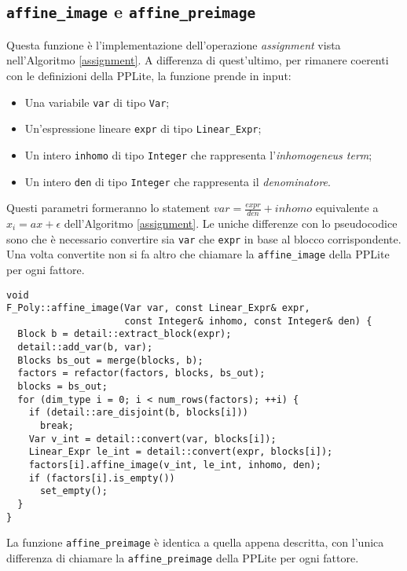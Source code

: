 \documentclass{mimosis}
\theoremstyle{definition}
\begin{document}
\subsection{\texttt{affine\_image} e \texttt{affine\_preimage}}
\label{sec:org766216e}
Questa funzione è l'implementazione dell'operazione \emph{assignment} vista
nell'Algoritmo \ref{assignment}. A differenza di quest'ultimo, per rimanere
coerenti con le definizioni della PPLite, la funzione prende in input:

\begin{itemize}
\item Una variabile \texttt{var} di tipo \texttt{Var};
\item Un'espressione lineare \texttt{expr} di tipo \texttt{Linear\_Expr};
\item Un intero \texttt{inhomo} di tipo \texttt{Integer} che rappresenta l'\emph{inhomogeneus term};
\item Un intero \texttt{den} di tipo \texttt{Integer} che rappresenta il \emph{denominatore}.
\end{itemize}

Questi parametri formeranno lo statement \(var = \frac{expr}{den} + inhomo\)
equivalente a \(x_i = ax + \epsilon\) dell'Algoritmo \ref{assignment}. Le uniche
differenze con lo pseudocodice sono che è necessario convertire sia \texttt{var} che
\texttt{expr} in base al blocco corrispondente. Una volta convertite non si fa altro
che chiamare la \texttt{affine\_image} della PPLite per ogni fattore.


\lstset{style=mystyle,language=C++,label= ,caption= ,captionpos=b,numbers=none}
\begin{lstlisting}
void
F_Poly::affine_image(Var var, const Linear_Expr& expr,
                     const Integer& inhomo, const Integer& den) {
  Block b = detail::extract_block(expr);
  detail::add_var(b, var);
  Blocks bs_out = merge(blocks, b);
  factors = refactor(factors, blocks, bs_out);
  blocks = bs_out;
  for (dim_type i = 0; i < num_rows(factors); ++i) {
    if (detail::are_disjoint(b, blocks[i]))
      break;
    Var v_int = detail::convert(var, blocks[i]);
    Linear_Expr le_int = detail::convert(expr, blocks[i]);
    factors[i].affine_image(v_int, le_int, inhomo, den);
    if (factors[i].is_empty())
      set_empty();
  }
}
\end{lstlisting}

La funzione \texttt{affine\_preimage} è identica a quella appena descritta, con l'unica
differenza di chiamare la \texttt{affine\_preimage} della PPLite per ogni fattore.
\end{document}
